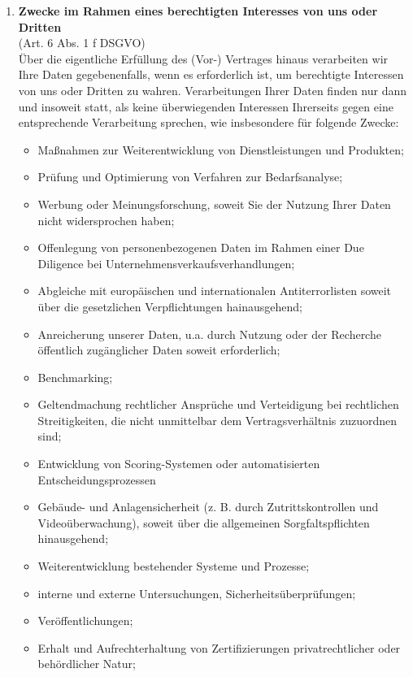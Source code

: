 \documentclass[a4paper, fontsize=11pt]{scrartcl}
\begin{document}
\begin{enumerate}[label=\textbf{\arabic*.},ref=\arabic*]
\begin{enumerate}[label=\textbf{\ref{zwecke}.\arabic*},ref=\ref{zwecke}.\arabic*]
    \item \label{zwecke2} \textbf{Zwecke im Rahmen eines berechtigten Interesses von uns oder Dritten} \\ (Art. 6 Abs. 1 f DSGVO) \\ Über die eigentliche Erfüllung des (Vor-) Vertrages hinaus verarbeiten wir Ihre Daten gegebenenfalls, wenn es erforderlich ist, um berechtigte Interessen von uns oder Dritten zu wahren. Verarbeitungen Ihrer Daten finden nur dann und insoweit statt, als keine überwiegenden Interessen Ihrerseits gegen eine entsprechende Verarbeitung sprechen, wie insbesondere für folgende Zwecke: \\
      \begin{itemize}
        \item Maßnahmen zur Weiterentwicklung von Dienstleistungen und Produkten;
        \item Prüfung und Optimierung von Verfahren zur Bedarfsanalyse;
        \item Werbung oder Meinungsforschung, soweit Sie der Nutzung Ihrer Daten nicht widersprochen haben;
        \item Offenlegung von personenbezogenen Daten im Rahmen einer Due Diligence bei Unternehmensverkaufsverhandlungen;
        \item Abgleiche mit europäischen und internationalen Antiterrorlisten soweit über die gesetzlichen Verpflichtungen hainausgehend;
        \item Anreicherung unserer Daten, u.a. durch Nutzung oder der Recherche öffentlich zugänglicher Daten soweit erforderlich;
        \item Benchmarking;
        \item Geltendmachung rechtlicher Ansprüche und Verteidigung bei rechtlichen Streitigkeiten, die nicht unmittelbar dem Vertragsverhältnis zuzuordnen sind;
        \item Entwicklung von Scoring-Systemen oder automatisierten Entscheidungsprozessen
        \item Gebäude- und Anlagensicherheit (z. B. durch Zutrittskontrollen und Videoüberwachung), soweit über die allgemeinen Sorgfaltspflichten hinausgehend;
        \item Weiterentwicklung bestehender Systeme und Prozesse;
        \item interne und externe Untersuchungen, Sicherheitsüberprüfungen;
        \item Veröffentlichungen;
        \item Erhalt und Aufrechterhaltung von Zertifizierungen privatrechtlicher oder behördlicher Natur;

\end{itemize}
\end{enumerate}
\end{enumerate}
\end{document}
